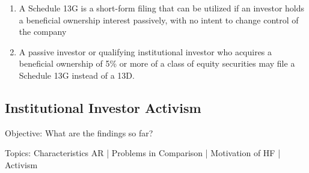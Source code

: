 \documentclass[12pt]{article}
\begin{document}
\begin{enumerate}
		\item A Schedule 13G is a short-form filing that can be utilized if an investor holds a beneficial ownership interest passively, with no intent to change control of the company \citep{Giglia2018}

		\item A passive investor or qualifying institutional investor who acquires a beneficial ownership of 5\% or more of a class of equity securities may file a Schedule 13G instead of a 13D. \citep{Brigida2012}
	\end{enumerate}

\subsection{Institutional Investor Activism}
\begin{center}
Objective: What are the findings so far?
\end{center}
Topics: Characteristics AR | Problems in Comparison | Motivation of HF | Activism
\end{document}
